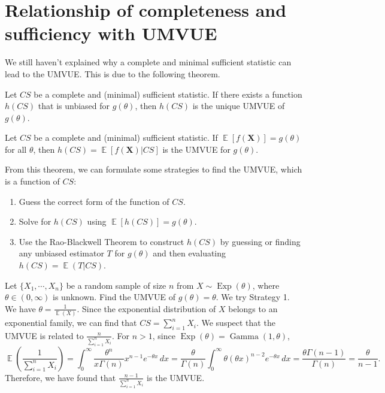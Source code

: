 \documentclass{huhtakm-template-book-v2}
\DeclareMathOperator{\E}{\mathbb{E}}
\DeclareMathOperator{\Exp}{Exp}
\DeclareMathOperator{\Gam}{Gamma}
\begin{document}
\section{Relationship of completeness and sufficiency with UMVUE}
    We still haven't explained why a complete and minimal sufficient statistic can lead to the UMVUE. This is due to the following theorem.
    \begin{thm} 
        Let $CS$ be a complete and (minimal) sufficient statistic. If there exists a function $h(CS)$ that is unbiased for $g(\theta)$, then $h(CS)$ is the unique UMVUE of $g(\theta)$.
    \end{thm}
    \begin{thm}
        Let $CS$ be a complete and (minimal) sufficient statistic. If $\E[f(\mathbf{X})]=g(\theta)$ for all $\theta$, then $h(CS)=\E[f(\mathbf{X})|CS]$ is the UMVUE for $g(\theta)$.
    \end{thm}
    \begin{rem}
        From this theorem, we can formulate some strategies to find the UMVUE, which is a function of $CS$:
        \begin{enumerate}
            \item Guess the correct form of the function of $CS$.
            \item Solve for $h(CS)$ using $\E[h(CS)]=g(\theta)$.
            \item Use the Rao-Blackwell Theorem to construct $h(CS)$ by guessing or finding any unbiased estimator $T$ for $g(\theta)$ and then evaluating $h(CS)=\E(T|CS)$.
        \end{enumerate}
    \end{rem}
    \begin{eg}
        \label{Chapter 3 (Example) UMVUE of Exp(theta)}
        Let $\{X_{1},\cdots,X_{n}\}$ be a random sample of size $n$ from $X\sim\Exp(\theta)$, where $\theta\in(0,\infty)$ is unknown. Find the UMVUE of $g(\theta)=\theta$. We try Strategy 1.\\
        We have $\theta=\frac{1}{\E(X)}$. Since the exponential distribution of $X$ belongs to an exponential family, we can find that $CS=\sum_{i=1}^{n}X_{i}$. We suspect that the UMVUE is related to $\frac{n}{\sum_{i=1}^{n}X_{i}}$. For $n>1$, since $\Exp(\theta)=\Gam(1,\theta)$,
        \begin{equation*}
            \E\left(\frac{1}{\sum_{i=1}^{n}X_{i}}\right)=\int_{0}^{\infty}\frac{\theta^{n}}{x\Gamma(n)}x^{n-1}e^{-\theta x}\,dx=\frac{\theta}{\Gamma(n)}\int_{0}^{\infty}\theta(\theta x)^{n-2}e^{-\theta x}\,dx=\frac{\theta\Gamma(n-1)}{\Gamma(n)}=\frac{\theta}{n-1}.
        \end{equation*}
        Therefore, we have found that $\frac{n-1}{\sum_{i=1}^{n}X_{i}}$ is the UMVUE.
    \end{eg}
\end{document}
